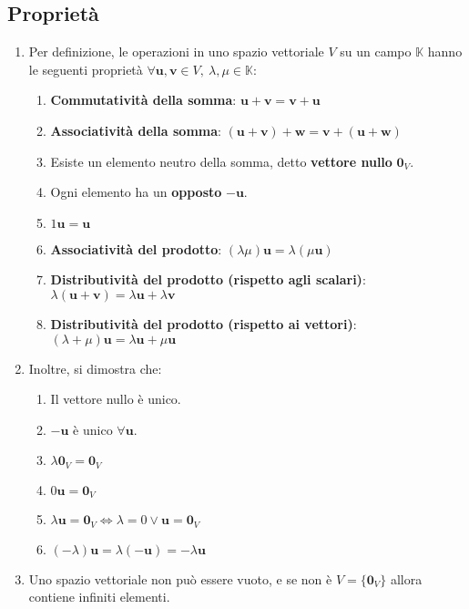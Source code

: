 \documentclass[draft]{article}
\newcommand{\bl}[1]{\mathbf{#1}}
\newcommand{\vu}{\mathbf{u}}
\newcommand{\vv}{\mathbf{v}}
\begin{document}
\subsection{Proprietà}
\begin{enumerate}

\item Per definizione, le operazioni in uno spazio vettoriale $V$ su un campo $\mathbb{K}$ hanno le seguenti proprietà $\forall \vu , \vv \in V , \ \lambda , \mu \in \mathbb{K}$:
\begin{enumerate}
\item \textbf{Commutatività della somma}: $\vu + \vv = \vv + \vu$ 
\item \textbf{Associatività della somma}: $(\vu + \vv) + \bl{w} = \vv + (\vu + \bl{w})$ 
\item Esiste un elemento neutro della somma, detto \textbf{vettore nullo} $\bl{0}_V$.
\item Ogni elemento ha un \textbf{opposto} $\bl{-u}$.
\item $1 \vu= \vu$
\item \textbf{Associatività del prodotto}: $(\lambda \mu) \vu = \lambda (\mu \vu)$
\item \textbf{Distributività del prodotto (rispetto agli scalari)}: \\ $\lambda (\vu + \vv)  = \lambda \vu + \lambda \vv $ 
\item \textbf{Distributività del prodotto (rispetto ai vettori)}: \\ $(\lambda + \mu) \vu = \lambda \vu + \mu \vu $ 
\end{enumerate}

\item Inoltre, si dimostra che:
\begin{enumerate}
\item Il vettore nullo è unico.
\item $\bl{-u}$ è unico $\forall \vu$.
\item $\lambda \bl{0}_V = \bl{0}_V$
\item $0 \vu = \bl{0}_V$
\item $\lambda \vu = \bl{0}_V \Leftrightarrow \lambda = 0 \vee \vu = \bl{0}_V$
\item $(- \lambda) \vu = \lambda (\bl{-u}) = - \lambda \vu$
\end{enumerate}

\item Uno spazio vettoriale non può essere vuoto, e se non è $V=\{\bl{0}_V\}$ allora contiene infiniti elementi.

\end{enumerate}
\end{document}
